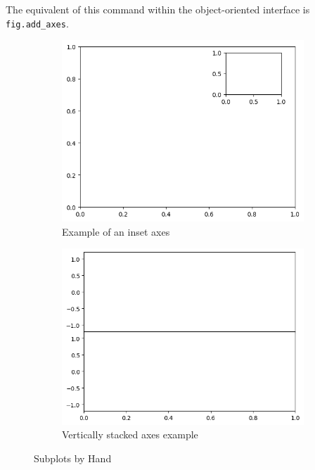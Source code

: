 The equivalent of this command within the object-oriented interface is \verb|fig.add_axes|.
\begin{figure}
    \centering
    \begin{subfigure}[b]{.45\textwidth}
        \includegraphics[width=\textwidth]{../Figures/Example of an inset axes.png}
        \caption{Example of an inset axes}
        \label{Example of an inset axes}
    \end{subfigure}
    \hfill
    \begin{subfigure}[b]{.45\textwidth}
        \includegraphics[width=\textwidth]{../Figures/Vertically stacked axes example.png}
        \caption{Vertically stacked axes example}
        \label{Vertically stacked axes example}
    \end{subfigure}
    \caption{Subplots by Hand}
\end{figure}
